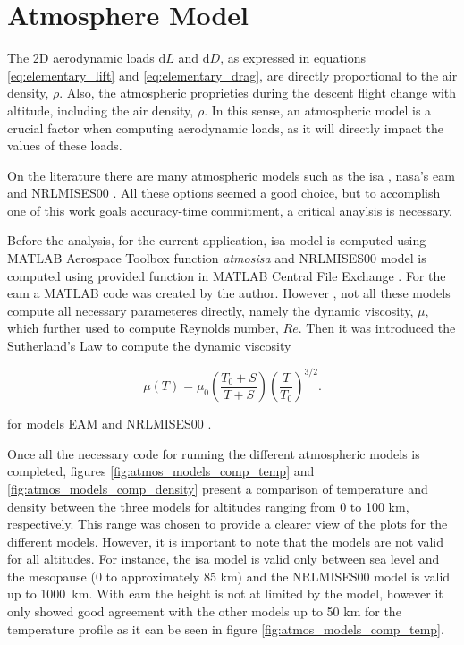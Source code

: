\section{Atmosphere Model}
\label{section:atmosphere_model}

The 2D aerodynamic loads $\mathrm{d}L$ and  $\mathrm{d}D$, as expressed in equations \ref{eq:elementary_lift} and \ref{eq:elementary_drag}, are directly proportional to the air density, $\rho$. Also, the atmospheric proprieties during the descent flight change with altitude, including the air density, $\rho$. In this sense, an atmospheric model is a crucial factor when computing aerodynamic loads, as it will directly impact the values of these loads. 

On the literature there are many atmospheric models such as the \gls{isa} \cite{noauthor_iso_nodate}, \gls{nasa}'s \gls{eam} \cite{noauthor_earth_nodate} and NRLMISES00 \cite{picone_nrlmsise00_2002}. All these options seemed a good choice, but to accomplish one of  this work goals accuracy-time commitment, a critical anaylsis is necessary.

Before the analysis, for the current application, \gls{isa} model is computed using MATLAB \cite{matlab_version_2024} Aerospace Toolbox \cite{noauthor_aerospace_nodate} function \textit{atmosisa} \cite{noauthor_atmosisa_nodate} and NRLMISES00 model is computed using provided function in MATLAB \cite{matlab_version_2024} Central File Exchange \cite{noauthor_atmosphere_2025}. For the \gls{eam} a MATLAB \cite{matlab_version_2024} code was created by the author. However , not all these models compute all necessary parameteres directly, namely the dynamic viscosity, $\mu$, which further used to compute Reynolds number, $Re$. Then it was introduced the Sutherland's Law to compute the dynamic viscosity

\begin{equation}
    \mu(T) = \mu_0 \left( \frac{T_0 + S}{T + S} \right) \left( \frac{T}{T_0} \right)^{3/2}.
\end{equation}

\noindent for models EAM \cite {noauthor_earth_nodate, noauthor_atmosisa_nodate} and NRLMISES00 \cite{picone_nrlmsise00_2002, noauthor_atmosphere_2025}.

Once all the necessary code for running the different atmospheric models is completed, figures \ref{fig:atmos_models_comp_temp} and \ref{fig:atmos_models_comp_density} present a comparison of temperature and density between the three models for altitudes ranging from 0 to 100 \unit{\km}, respectively. This range was chosen to provide a clearer view of the plots for the different models. However, it is important to note that the models are not valid for all altitudes. For instance, the \gls{isa} model is valid only between sea level and the mesopause (0 to approximately 85 \unit{\km}) and the NRLMISES00 model is valid up to 1000~\unit{\km}. With \gls{eam} the height is not at limited by the model, however it only showed good agreement with the other models up to 50 \unit{\km} for the temperature profile as it can be seen in figure \ref{fig:atmos_models_comp_temp}.


